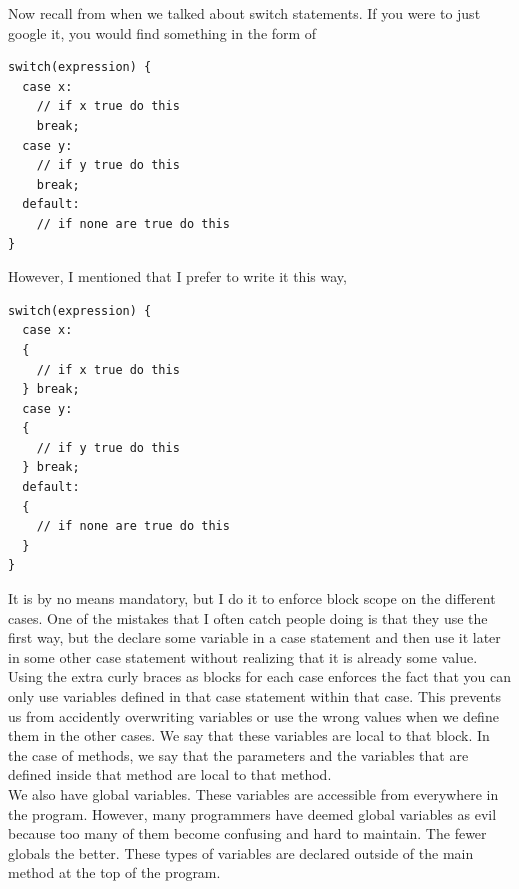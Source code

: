 \documentclass[11]{article}
\begin{document}
Now recall from when we talked about switch statements. If you were to just google it, you would find something in the form of

\begin{lstlisting}
switch(expression) {
  case x:
    // if x true do this
    break;
  case y:
    // if y true do this
    break;
  default:
    // if none are true do this
}
\end{lstlisting}

However, I mentioned that I prefer to write it this way, 
\begin{lstlisting}
switch(expression) {
  case x:
  {
    // if x true do this
  } break;
  case y:
  {
    // if y true do this
  } break;
  default:
  {
    // if none are true do this
  }
}
\end{lstlisting}

It is by no means mandatory, but I do it to enforce block scope on the different cases. One of the mistakes that I often catch people doing is that they use the first way, but the declare some variable in a case statement and then use it later in some other case statement without realizing that it is already some value. Using the extra curly braces as blocks for each case enforces the fact that you can only use variables defined in that case statement within that case. This prevents us from accidently overwriting variables or use the wrong values when we define them in the other cases. We say that these variables are local to that block. In the case of methods, we say that the parameters and the variables that are defined inside that method are local to that method.\\

We also have global variables. These variables are accessible from everywhere in the program. However, many programmers have deemed global variables as evil because too many of them become confusing and hard to maintain. The fewer globals the better. These types of variables are declared outside of the main method at the top of the program.
\end{document}
